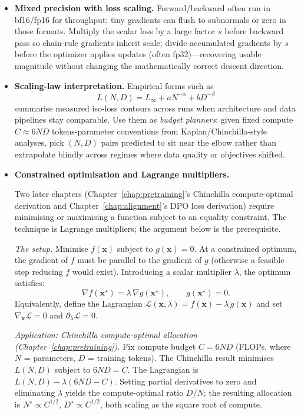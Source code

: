 \begin{itemize}[leftmargin=1.5em]
  \item \textbf{Mixed precision with loss scaling.}  
  Forward/backward often run in bf16/fp16 for throughput; tiny gradients can flush to subnormals or zero in those formats. Multiply the scalar loss by a large factor $s$ before backward pass so chain-rule gradients inherit scale; divide accumulated gradients by $s$ before the optimizer applies updates (often fp32)---recovering usable magnitude without changing the mathematically correct descent direction.

  \item \textbf{Scaling-law interpretation.}
  Empirical forms such as
  \[
    L(N,D)=L_\infty + aN^{-\alpha} + bD^{-\beta}
  \]
  summarise measured iso-loss contours across runs when architecture and data pipelines stay comparable. Use them as \emph{budget planners}: given fixed compute $C\approx 6ND$ tokens-parameter conventions from Kaplan/Chinchilla-style analyses, pick $(N,D)$ pairs predicted to sit near the elbow rather than extrapolate blindly across regimes where data quality or objectives shifted.

  \item \textbf{Constrained optimisation and Lagrange multipliers.}

  Two later chapters (Chapter~\ref{chap:pretraining}'s Chinchilla compute-optimal derivation and Chapter~\ref{chap:alignment}'s DPO loss derivation) require minimising or maximising a function subject to an equality constraint. The technique is Lagrange multipliers; the argument below is the prerequisite.

  \emph{The setup.} Minimise $f(\mathbf{x})$ subject to $g(\mathbf{x}) = 0$. At a constrained optimum, the gradient of $f$ must be parallel to the gradient of $g$ (otherwise a feasible step reducing $f$ would exist). Introducing a scalar multiplier $\lambda$, the optimum satisfies:
  \[
    \nabla f(\mathbf{x}^\star) = \lambda \,\nabla g(\mathbf{x}^\star),
    \qquad g(\mathbf{x}^\star) = 0.
  \]
  Equivalently, define the Lagrangian $\mathcal{L}(\mathbf{x},\lambda) = f(\mathbf{x}) - \lambda\, g(\mathbf{x})$ and set $\nabla_{\mathbf{x}}\mathcal{L} = 0$ and $\partial_\lambda \mathcal{L} = 0$.

  \emph{Application: Chinchilla compute-optimal allocation (Chapter~\ref{chap:pretraining}).}
  Fix compute budget $C = 6ND$ (FLOPs, where $N$ = parameters, $D$ = training tokens). The Chinchilla result minimises $L(N,D)$ subject to $6ND = C$. The Lagrangian is $L(N,D) - \lambda(6ND - C)$. Setting partial derivatives to zero and eliminating $\lambda$ yields the compute-optimal ratio $D/N$; the resulting allocation is $N^\star \propto C^{1/2}$, $D^\star \propto C^{1/2}$, both scaling as the square root of compute.


\end{itemize}
